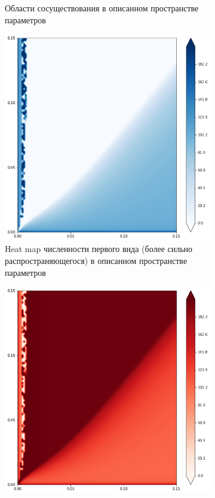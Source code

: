 \begin{figure}[ht]
\begin{subfigure}{.5\textwidth}
		\caption{Области сосуществования в описанном пространстве параметров} 
		\label{fig:hmd1:sub2}
	\end{subfigure}
\begin{subfigure}{.5\textwidth}
	\centering
	\includegraphics[width=.93\linewidth]{hm_d1_n1.png}
	\caption{Heat map численности первого вида (более сильно распространяющегося) в описанном пространстве параметров}
	\label{fig:hmd1:sub3}
\end{subfigure}%
\begin{subfigure}{.5\textwidth}
	\centering
	\includegraphics[width=.93\linewidth]{hm_d1_n2.png}

\end{subfigure}
\end{figure}
